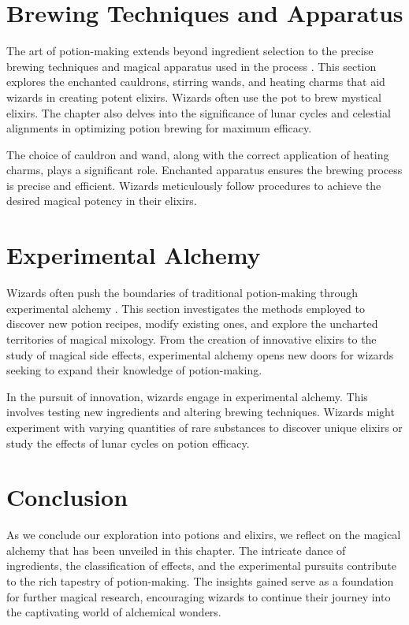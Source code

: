 \section{Brewing Techniques and Apparatus}
The art of potion-making extends beyond ingredient selection to the precise brewing techniques and magical apparatus used in the process \cite{potionbrewingtechniques2017}. This section explores the enchanted cauldrons, stirring \glspl{wand}, and heating charms that aid wizards in creating potent elixirs. Wizards often use the \gls{pot} to brew mystical elixirs. The chapter also delves into the significance of lunar cycles and celestial alignments in optimizing potion brewing for maximum efficacy.

The choice of cauldron and \gls{wand}, along with the correct application of heating charms, plays a significant role. Enchanted apparatus ensures the brewing process is precise and efficient. Wizards meticulously follow procedures to achieve the desired magical potency in their elixirs.

\section{Experimental Alchemy}
Wizards often push the boundaries of traditional potion-making through experimental alchemy \cite{darkartselixirs2015}. This section investigates the methods employed to discover new potion recipes, modify existing ones, and explore the uncharted territories of magical mixology. From the creation of innovative elixirs to the study of magical side effects, experimental alchemy opens new doors for wizards seeking to expand their knowledge of potion-making.

In the pursuit of innovation, wizards engage in experimental alchemy. This involves testing new ingredients and altering brewing techniques. Wizards might experiment with varying quantities of rare substances to discover unique elixirs or study the effects of lunar cycles on potion efficacy.

\section{Conclusion}
As we conclude our exploration into potions and elixirs, we reflect on the magical alchemy that has been unveiled in this chapter. The intricate dance of ingredients, the classification of effects, and the experimental pursuits contribute to the rich tapestry of potion-making. The insights gained serve as a foundation for further magical research, encouraging wizards to continue their journey into the captivating world of alchemical wonders.


